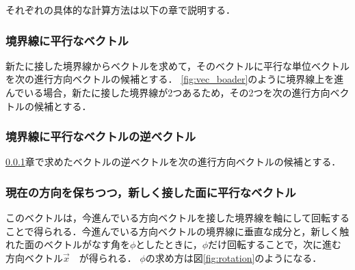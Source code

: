 \documentclass[a4paper,11pt]{jarticle}
\begin{document}
	それぞれの具体的な計算方法は以下の章で説明する．
	\subsubsection{境界線に平行なベクトル}
	\label{boader}
	新たに接した境界線からベクトルを求めて，そのベクトルに平行な単位ベクトルを次の進行方向ベクトルの候補とする．
	\ref{fig:vec_boader}のように境界線上を進んでいる場合，新たに接した境界線が2つあるため，その2つを次の進行方向ベクトルの候補とする．
	
	\subsubsection{境界線に平行なベクトルの逆ベクトル}
	\ref{boader}章で求めたベクトルの逆ベクトルを次の進行方向ベクトルの候補とする．
	
	\subsubsection{現在の方向を保ちつつ，新しく接した面に平行なベクトル}
	\label{rotation}
	このベクトルは，今進んでいる方向ベクトルを接した境界線を軸にして回転することで得られる．今進んでいる方向ベクトルの境界線に垂直な成分と，新しく触れた面のベクトルがなす角を$ \phi $としたときに，$\phi$だけ回転することで，次に進む方向ベクトル$ \vec{x} $　が得られる．
	$\phi$の求め方は図\ref{fig:rotation}のようになる．
	
\end{document}
